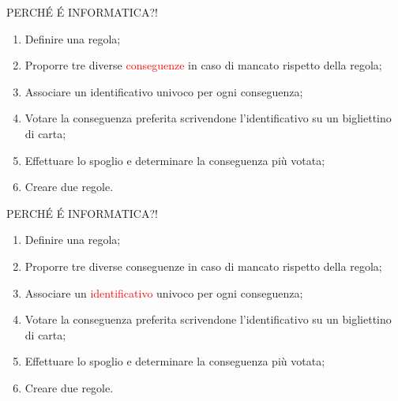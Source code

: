 \documentclass[aspectratio=1610]{beamer}
\begin{document}
\begin{frame}{PERCH\'E \'E INFORMATICA?!}
    \begin{enumerate}
        \item Definire una regola;
        \item Proporre tre diverse \textcolor{red}{conseguenze} in caso di mancato rispetto della regola;
        \item Associare un identificativo univoco per ogni conseguenza;
        \item Votare la conseguenza preferita scrivendone l'identificativo su un bigliettino di carta;
        \item Effettuare lo spoglio e determinare la conseguenza più votata;
        \item Creare due regole.
    \end{enumerate}
\end{frame}

\begin{frame}{PERCH\'E \'E INFORMATICA?!}
    \begin{enumerate}
        \item Definire una regola;
        \item Proporre tre diverse conseguenze in caso di mancato rispetto della regola;
        \item Associare un \textcolor{red}{identificativo} univoco per ogni conseguenza;
        \item Votare la conseguenza preferita scrivendone l'identificativo su un bigliettino di carta;
        \item Effettuare lo spoglio e determinare la conseguenza più votata;
        \item Creare due regole.
    \end{enumerate}
\end{frame}
\end{document}
